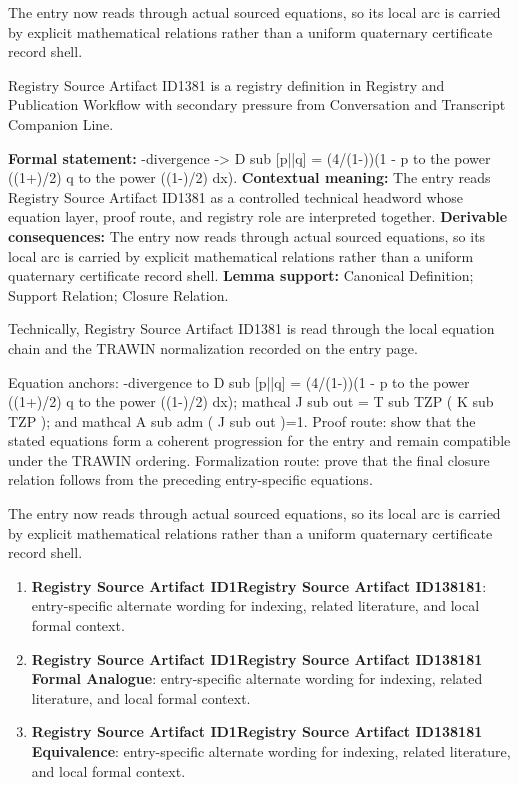 The entry now reads through actual sourced equations, so its local arc is carried by explicit mathematical relations rather than a uniform quaternary certificate record shell.
\clearpage


\begingroup\small
{}
Registry Source Artifact ID1381 is a registry definition in Registry and Publication Workflow with secondary pressure from Conversation and Transcript Companion Line.

\begingroup\footnotesize\setlength{\emergencystretch}{3em}\sloppy
\textbf{Formal statement:} -divergence -> D sub [p||q] = (4/(1-))(1 - p to the power ((1+)/2) q to the power ((1-)/2) dx). \textbf{Contextual meaning:} The entry reads Registry Source Artifact ID1381 as a controlled technical headword whose equation layer, proof route, and registry role are interpreted together. \textbf{Derivable consequences:} The entry now reads through actual sourced equations, so its local arc is carried by explicit mathematical relations rather than a uniform quaternary certificate record shell. \textbf{Lemma support:} Canonical Definition; Support Relation; Closure Relation.\par
\endgroup

Technically, Registry Source Artifact ID1381 is read through the local equation chain and the TRAWIN normalization recorded on the entry page.

Equation anchors: -divergence to D sub [p||q] = (4/(1-))(1 - p to the power ((1+)/2) q to the power ((1-)/2) dx); mathcal J sub out = T sub TZP ( K sub TZP ); and mathcal A sub adm ( J sub out )=1. Proof route: show that the stated equations form a coherent progression for the entry and remain compatible under the TRAWIN ordering. Formalization route: prove that the final closure relation follows from the preceding entry-specific equations.

The entry now reads through actual sourced equations, so its local arc is carried by explicit mathematical relations rather than a uniform quaternary certificate record shell.
\endgroup

\begin{enumerate}[leftmargin=1.6em,itemsep=6pt,topsep=4pt]
\item \textbf{Registry Source Artifact ID1Registry Source Artifact ID138181}: entry-specific alternate wording for indexing, related literature, and local formal context.
\item \textbf{Registry Source Artifact ID1Registry Source Artifact ID138181 Formal Analogue}: entry-specific alternate wording for indexing, related literature, and local formal context.
\item \textbf{Registry Source Artifact ID1Registry Source Artifact ID138181 Equivalence}: entry-specific alternate wording for indexing, related literature, and local formal context.
\end{enumerate}


